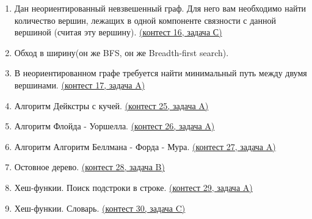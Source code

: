 \documentclass[a4paper,12pt]{article}
\begin{document}
\begin{enumerate}
\item Дан неориентированный невзвешенный граф. Для него вам необходимо найти количество вершин, лежащих в одной компоненте связности с данной вершиной (считая эту вершину). \href{https://informatics.msk.ru/mod/statements/view3.php?chapterid=165}{(контест 16, задача С)}
\item Обход в ширину(он же BFS, он же Breadth-first search).
\item В неориентированном графе требуется найти минимальный путь между двумя вершинами. \href{https://informatics.msk.ru/mod/statements/view3.php?chapterid=160}{(контест 17, задача A)}
\item Алгоритм Дейкстры с кучей. \href{https://informatics.msk.ru/mod/statements/view3.php?chapterid=3347}{(контест 25, задача A)}
\item Алгоритм Флойда - Уоршелла. \href{https://informatics.msk.ru/mod/statements/view3.php?chapterid=171}{(контест 26, задача A)}
\item Алгоритм Алгоритм Беллмана - Форда - Мура. \href{https://informatics.msk.ru/mod/statements/view3.php?chapterid=178}{(контест 27, задача A)}
\item Остовное дерево. \href{https://informatics.msk.ru/mod/statements/view3.php?chapterid=1377}{(контест 28, задача B)}
\item Хеш-функии. Поиск подстроки в строке. \href{https://informatics.msk.ru/mod/statements/view3.php?chapterid=99}{(контест 29, задача A)}
\item Хеш-функии. Словарь. \href{https://informatics.msk.ru/mod/statements/view3.php?chapterid=3767}{(контест 30, задача C)}
\end{enumerate}
\end{document}
